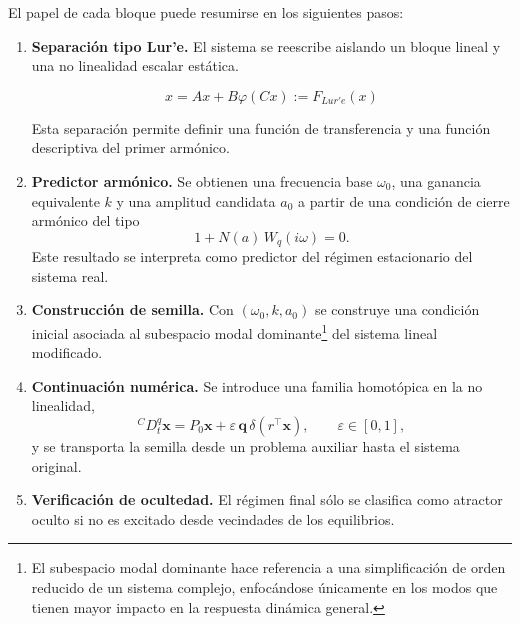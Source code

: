 \documentclass[journal]{IEEEtran}
\begin{document}
El papel de cada bloque puede resumirse en los siguientes pasos:


\begin{enumerate}
    \item \textbf{Separación tipo Lur'e.} El sistema se reescribe aislando un bloque lineal y una no linealidad escalar estática. 
    
    \begin{equation}
        x = Ax + B\varphi (Cx) := F_{Lur'e}(x)
    \end{equation}
    
    Esta separación permite definir una función de transferencia y una función descriptiva del primer armónico.

    \item \textbf{Predictor armónico.} Se obtienen una frecuencia base \(\omega_0\), una ganancia equivalente \(k\) y una amplitud candidata \(a_0\) a partir de una condición de cierre armónico del tipo
    \[
    1 + N(a)\,W_q(i\omega)=0.
    \]
    Este resultado se interpreta como predictor del régimen estacionario del sistema real.

    \item \textbf{Construcción de semilla.} Con \((\omega_0,k,a_0)\) se construye una condición inicial asociada al subespacio modal dominante\footnote{El subespacio modal dominante hace referencia a una simplificación de orden reducido de un sistema complejo, enfocándose únicamente en los modos que tienen mayor impacto en la respuesta dinámica general.} del sistema lineal modificado.

    \item \textbf{Continuación numérica.} Se introduce una familia homotópica en la no linealidad,
    \[
    {}^{C}D_t^q \bm{x}=P_0\bm{x}+\varepsilon\,\bm{q}\,\delta(r^\top \bm{x}),
    \qquad \varepsilon\in[0,1],
    \]
    y se transporta la semilla desde un problema auxiliar hasta el sistema original.

    \item \textbf{Verificación de ocultedad.} El régimen final sólo se clasifica como atractor oculto si no es excitado desde vecindades de los equilibrios.
\end{enumerate}
\end{document}
